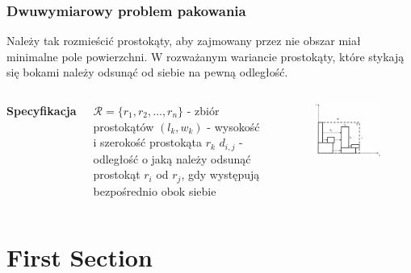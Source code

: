 \documentclass{beamer}
\begin{document}
\begin{frame}
    \frametitle{Dwuwymiarowy problem pakowania}
    Należy tak rozmieścić prostokąty, aby zajmowany przez nie obszar miał minimalne pole powierzchni. W rozważanym wariancie prostokąty, które stykają się bokami należy odsunąć
    od siebie na pewną odległość.
   
    \begin{columns}[c]
        
        \textbf{Specyfikacja}
        \begin{outline}
            \1 $\mathcal{R}=\{r_1,r_2,\dots,r_n \}$ - zbiór prostokątów
            \1 $(l_k,w_k)$ - wysokość i szerokość prostokąta $r_k$
            \1 $d_{i,j}$ - odległość o jaką należy odsunąć prostokąt $r_i$ od $r_j$,
            gdy występują bezpośrednio obok siebie
        \end{outline}
        
         \begin{figure}[prostokaty]
             \centering
             \includegraphics[scale=0.5]{diagram_prostokaty}
         \end{figure}
        
    \end{columns}
\end{frame}
\section{First Section} %
\end{document}
